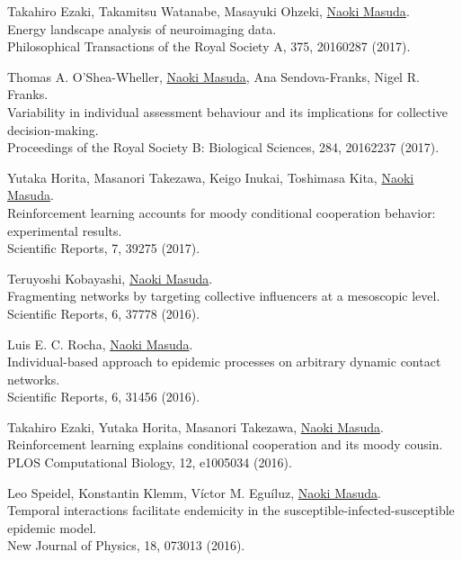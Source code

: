 \documentclass[11pt,letter]{article}
\begin{document}
\begin{etaremune}
\item Takahiro Ezaki, Takamitsu Watanabe, Masayuki Ohzeki, \underline{Naoki Masuda}.\\
Energy landscape analysis of neuroimaging data.\\
Philosophical Transactions of the Royal Society A, 375, 20160287 (2017).

\item Thomas A. O'Shea-Wheller, \underline{Naoki Masuda}, Ana Sendova-Franks, Nigel R. Franks.\\
Variability in individual assessment behaviour and its implications for collective decision-making.\\
Proceedings of the Royal Society B: Biological Sciences, 284, 20162237 (2017).

\item Yutaka Horita, Masanori Takezawa, Keigo Inukai, Toshimasa Kita, \underline{Naoki Masuda}.\\
Reinforcement learning accounts for moody conditional cooperation behavior: experimental results.\\
Scientific Reports, 7, 39275 (2017).

\item
Teruyoshi Kobayashi, \underline{Naoki Masuda}.\\
Fragmenting networks by targeting collective influencers at a mesoscopic level.\\
Scientific Reports, 6, 37778 (2016).

\item Luis E. C. Rocha, \underline{Naoki Masuda}.\\
Individual-based approach to epidemic processes on arbitrary dynamic contact networks.\\
Scientific Reports, 6, 31456 (2016).

\item Takahiro Ezaki, Yutaka Horita, Masanori Takezawa, \underline{Naoki Masuda}.\\
Reinforcement learning explains conditional cooperation and its moody cousin.\\
PLOS Computational Biology, 12, e1005034 (2016).

\item Leo Speidel, Konstantin Klemm, V\'{i}ctor M. Egu\'{i}luz, \underline{Naoki Masuda}.\\
Temporal interactions facilitate endemicity in the susceptible-infected-susceptible epidemic model.\\
New Journal of Physics, 18, 073013 (2016).


\end{etaremune}
\end{document}
